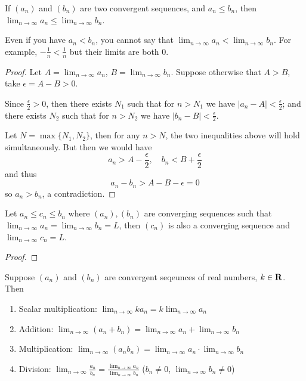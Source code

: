 \begin{lemma}
If $(a_n)$ and $(b_n)$ are two convergent sequences, and $a_n \le b_n$, then $\displaystyle\lim_{n\to\infty}a_n\le\lim_{n\to\infty}b_n$.
\end{lemma}

\begin{remark}
Even if you have $a_n<b_n$, you cannot say that $\displaystyle\lim_{n\to\infty}a_n<\lim_{n\to\infty}b_n$. For example, $-\frac{1}{n}<\frac{1}{n}$ but their limits are both $0$.
\end{remark}

\begin{proof}
Let $\displaystyle A=\lim_{n\to\infty}a_n$, $\displaystyle B=\lim_{n\to\infty}b_n$. Suppose otherwise that $A>B$, take $\epsilon=A-B>0$.

Since $\frac{\epsilon}{2}>0$, then there exists $N_1$ such that for $n>N_1$ we have $|a_n-A|<\frac{\epsilon}{2}$; and there exists $N_2$ such that for $n>N_2$ we have $|b_n-B|<\frac{\epsilon}{2}$.

Let $N=\max\{N_1,N_2\}$, then for any $n>N$, the two inequalities above will hold simultaneously. But then we would have
\[a_n>A-\frac{\epsilon}{2},\quad b_n<B+\frac{\epsilon}{2}\]
and thus
\[a_n-b_n>A-B-\epsilon=0\]
so $a_n>b_n$, a contradiction.
\end{proof}

\begin{theorem}
Let $a_n\le c_n\le b_n$ where $(a_n),(b_n)$ are converging sequences such that $\displaystyle\lim_{n\to\infty}a_n=\lim_{n\to\infty}b_n=L$, then $(c_n)$ is also a converging sequence and $\displaystyle\lim_{n\to\infty}c_n=L$.
\end{theorem}

\begin{proof}

\end{proof}

\begin{lemma}
Suppose $(a_n)$ and $(b_n)$ are convergent seqeunces of real numbers, $k\in\mathbf R$. Then
\begin{enumerate}[label=(\arabic*)]
\item Scalar multiplication: $\displaystyle\lim_{n\to\infty} ka_n=k\lim_{n\to\infty}a_n$
\item Addition: $\displaystyle\lim_{n\to\infty}(a_n+b_n)=\lim_{n\to\infty}a_n+\lim_{n\to\infty}b_n$
\item Multiplication: $\displaystyle\lim_{n\to\infty}(a_n b_n)=\lim_{n\to\infty}a_n\cdot\lim_{n\to\infty}b_n$
\item Division: $\displaystyle\lim_{n\to\infty}\frac{a_n}{b_n}=\frac{\lim_{n\to\infty} a_n}{\lim_{n\to\infty} b_n}$ ($b_n\neq0$, $\displaystyle\lim_{n\to\infty}b_n\neq0$)
\end{enumerate}
\end{lemma}

